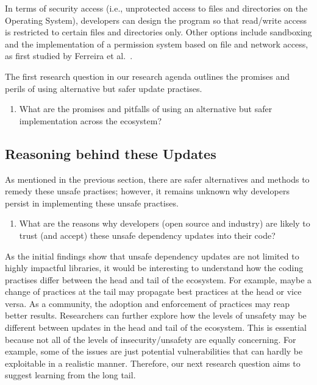 \documentclass[sigconf,screen]{acmart}
\begin{document}
\begin{sloppy}
In terms of security access (i.e., unprotected access to files and directories on the Operating System), developers can design the program so that read/write access is restricted to certain files and directories only. Other options include sandboxing and the implementation of a permission system based on file and network access, as first studied by Ferreira et al.~\citep{Ferreira:icse2021}.

The first research question in our research agenda outlines the promises and perils of using alternative but safer update practises.


\begin{enumerate}
 
    \item What are the promises and pitfalls of using an alternative but safer implementation across the ecosystem?

\end{enumerate}



\subsection{Reasoning behind these Updates}
As mentioned in the previous section, there are safer alternatives and methods to remedy these unsafe practises; however, it remains unknown why developers persist in implementing these unsafe practises.
\begin{enumerate}[resume]
    \item What are the reasons why developers (open source and industry) are likely to trust (and accept) these unsafe dependency updates into their code?

\end{enumerate}


As the initial findings show that unsafe dependency updates are not limited to highly impactful libraries, it would be interesting to understand how the coding practises differ between the head and tail of the ecosystem.
For example, maybe a change of practices at the tail may propagate best practices at the head or vice versa.
As a community, the adoption and enforcement of practices may reap better results.
Researchers can further explore how the levels of unsafety may be different between updates in the head and
tail of the ecosystem.
This is essential because not all of the levels of insecurity/unsafety are equally concerning.
For example, some of the issues are just potential vulnerabilities that can hardly be exploitable in a realistic manner.
Therefore, our next research question aims to suggest learning from the long tail.



\end{sloppy}
\end{document}
